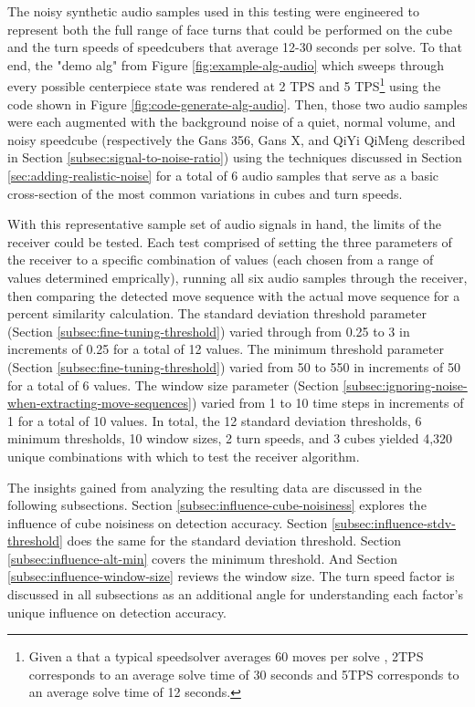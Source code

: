 The noisy synthetic audio samples used in this testing were engineered
to represent both the full range of face turns that could be performed
on the cube and the turn speeds of speedcubers that average 12-30
seconds per solve. To that end, the "demo alg" from Figure
\ref{fig:example-alg-audio} which sweeps through every possible
centerpiece state was rendered at 2 TPS and 5 TPS\footnote{Given a that
a typical speedsolver averages 60 moves per solve \cite{pochmann-hume}, 2TPS
corresponds to an average solve time of 30 seconds and 5TPS corresponds
to an average solve time of 12 seconds.} using the code shown in Figure
\ref{fig:code-generate-alg-audio}. Then, those two audio samples were
each augmented with the background noise of a quiet, normal volume, and
noisy speedcube (respectively the Gans 356, Gans X, and QiYi QiMeng
described in Section \ref{subsec:signal-to-noise-ratio}) using the
techniques discussed in Section \ref{sec:adding-realistic-noise} for a
total of 6 audio samples that serve as a basic cross-section of the
most common variations in cubes and turn speeds.

With this representative sample set of audio signals in hand, the
limits of the receiver could be tested. Each test comprised of setting
the three parameters of the receiver to a specific combination of
values (each chosen from a range of values determined emprically),
running all six audio samples through the receiver, then comparing the
detected move sequence with the actual move sequence for a percent
similarity calculation. The standard deviation threshold parameter
 (Section \ref{subsec:fine-tuning-threshold}) varied
through from 0.25 to 3 in increments of 0.25 for a total of 12 values.
The minimum threshold parameter  (Section
\ref{subsec:fine-tuning-threshold}) varied from 50 to 550 in increments
of 50 for a total of 6 values. The window size parameter
 (Section
\ref{subsec:ignoring-noise-when-extracting-move-sequences}) varied from
1 to 10 time steps in increments of 1 for a total of 10 values. In
total, the 12 standard deviation thresholds, 6 minimum thresholds, 10
window sizes, 2 turn speeds, and 3 cubes yielded 4,320 unique
combinations with which to test the receiver algorithm.

The insights gained from analyzing the resulting data are discussed in
the following subsections. Section
\ref{subsec:influence-cube-noisiness} explores the influence of cube
noisiness on detection accuracy. Section
\ref{subsec:influence-stdv-threshold} does the same for the standard
deviation threshold. Section \ref{subsec:influence-alt-min} covers the
minimum threshold. And Section \ref{subsec:influence-window-size}
reviews the window size. The turn speed factor is discussed in all
subsections as an additional angle for understanding each factor's
unique influence on detection accuracy.

